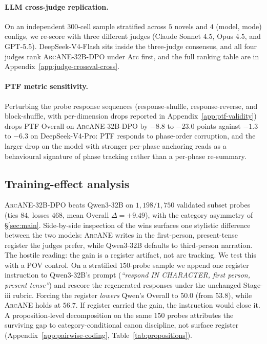 \documentclass[11pt]{article}
\newcommand{\ours}{\textsc{ArcANE}}
\begin{document}
\paragraph{LLM cross-judge replication.} On an independent $300$-cell sample stratified across $5$ novels and $4$ (model, mode) configs, we re-score with three different judges (Claude Sonnet 4.5, Opus 4.5, and GPT-5.5). DeepSeek-V4-Flash sits inside the three-judge consensus, and all four judges rank \ours{}-32B-DPO under Arc first, and the full ranking table are in Appendix~\ref{app:judge-crossval-cross}.

\paragraph{PTF metric sensitivity.} Perturbing the probe response sequences (response-shuffle, response-reverse, and block-shuffle, with per-dimension drops reported in Appendix~\ref{app:ptf-validity}) drops PTF Overall on \ours{}-32B-DPO by $-8.8$ to $-23.0$ points against $-1.3$ to $-6.3$ on DeepSeek-V4-Pro: PTF responds to phase-order corruption, and the larger drop on the model with stronger per-phase anchoring reads as a behavioural signature of phase tracking rather than a per-phase re-summary.

\subsection{Training-effect analysis\label{sec:error-analysis}}
\ours{}-32B-DPO beats Qwen3-32B on $1{,}198/1{,}750$ validated subset probes (ties $84$, losses $468$, mean Overall $\Delta{=}{+}9.49$), with the category asymmetry of \S\ref{sec:main}. Side-by-side inspection of the wins surfaces one stylistic difference between the two models: \ours{} writes in the first-person, present-tense register the judges prefer, while Qwen3-32B defaults to third-person narration. The hostile reading: the gain is a register artifact, not arc tracking. We test this with a POV control. On a stratified $150$-probe sample we append one register instruction to Qwen3-32B's prompt (\emph{``respond IN CHARACTER, first person, present tense''}) and rescore the regenerated responses under the unchanged Stage-iii rubric. Forcing the register \emph{lowers} Qwen's Overall to $50.0$ (from $53.8$), while \ours{} holds at $56.7$. If register carried the gain, the instruction would close it. A proposition-level decomposition on the same $150$ probes attributes the surviving gap to category-conditional canon discipline, not surface register (Appendix~\ref{app:pairwise-coding}, Table~\ref{tab:propositions}).
\end{document}
